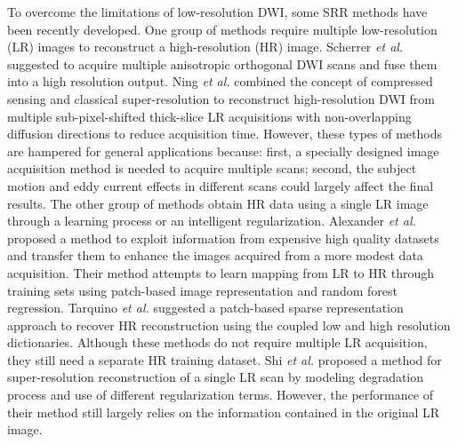 To overcome the limitations of low-resolution DWI, some SRR methods have been recently developed.
One group of methods require multiple low-resolution (LR) images to reconstruct a high-resolution (HR) image.
%
Scherrer \emph{et al.} \cite{scherrer2012} suggested to acquire multiple anisotropic orthogonal DWI scans and fuse them into a high resolution output.
%
Ning \emph{et al.} \cite{ning2015} combined the concept of compressed sensing and classical super-resolution to reconstruct high-resolution DWI from multiple sub-pixel-shifted thick-slice LR acquisitions with non-overlapping diffusion directions to reduce acquisition time.
%
However, these types of methods are hampered for general applications because: first, a specially designed image acquisition method is needed to acquire multiple scans; second, the subject motion and eddy current effects in different scans could largely affect the final results.
%
The other group of methods obtain HR data using a single LR image through a learning process or an intelligent regularization.
%
Alexander \emph{et al.} \cite{alexander2014} proposed a method to exploit information from expensive high quality datasets and transfer them to enhance the images acquired from a more modest data acquisition. Their method attempts to learn mapping from LR to HR through training sets using patch-based image representation and random forest regression. Tarquino \emph{et al.} \cite{tarquino2014} suggested a patch-based sparse representation approach to recover HR reconstruction using the coupled low and high resolution dictionaries. Although these methods do not require multiple LR acquisition, they still need a separate HR training dataset.
Shi \emph{et al.} \cite{shi2015} proposed a method for super-resolution reconstruction of a single LR scan by modeling degradation process and use of different regularization terms. However, the performance of their method still largely relies on the information contained in the original LR image.

